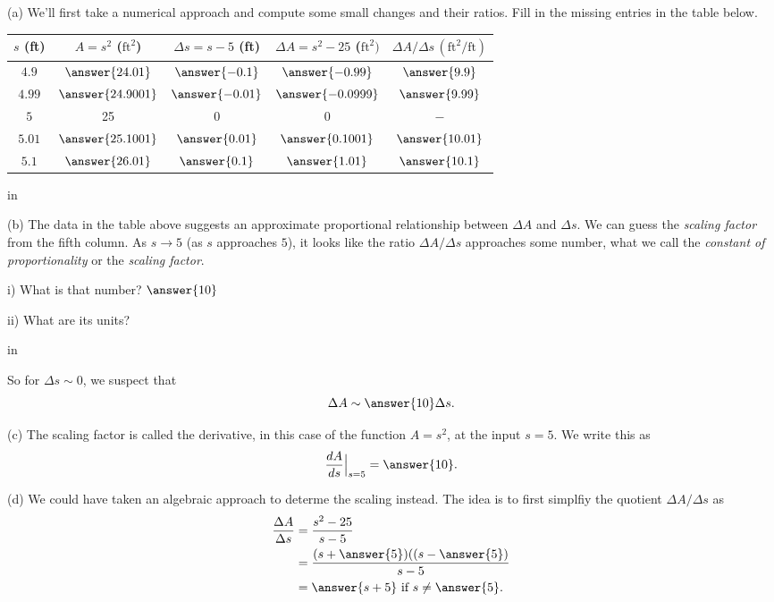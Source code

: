 \documentclass{ximera}
\newcommand{\pskip}{\vskip 0.1 in}
\begin{document}
\begin{question}  \label{Qfrdsft4t4tt}
(a) We'll first take a numerical approach and compute some small changes and their ratios. Fill in the missing entries in the table below.

\begin{center}
  \begin{tabular}{ | c| c | c | c | c |}
    \hline
    $s$ (ft) & $A = s^2$ ($\text{ft}^2$) & $\Delta s = s-5$ (ft)  & $\Delta A = s^2 - 25$ ($\text{ft}^2)$ & $\Delta A/\Delta s \, (\text{ft}^2/\text{ft})$ \\ \hline
    $4.9$ & $\answer{24.01}$ & $\answer{-0.1}$ &  $\answer{-0.99}$ & $\answer{9.9}$ \\ \hline
    $4.99$ & $\answer{24.9001}$ & $\answer{-0.01}$ &  $\answer{-0.0999}$ & $\answer{9.99}$ \\ \hline
    $5$  &  25 & $0$ & $0$ & $-$  \\ \hline
    $5.01$ & $\answer{25.1001}$ & $\answer{0.01}$ &  $\answer{0.1001}$ & $\answer{10.01}$ \\ \hline
    $5.1$ & $\answer{26.01}$ & $\answer{0.1}$ &  $\answer{1.01}$ & $\answer{10.1}$ \\ \hline
    \hline
  \end{tabular}
\end{center}

\pskip

(b) The data in the table above suggests an approximate proportional relationship between $\Delta A$ and $\Delta s$. We can guess the \emph{scaling factor} from the fifth column. As $s\to 5$ (as $s$ approaches $5$), it looks like the ratio $\Delta A/\Delta s$ approaches some number, what we call the \emph{constant of proportionality} or the \emph{scaling factor}.

i) What is that number? $\answer{10}$

ii) What are its units?
\begin{freeResponse}
\end{freeResponse}

\pskip

So for $\Delta s \sim 0$, we suspect that
\[
   \Delta A \sim \answer{10} \Delta s .
\]

(c) The scaling factor is called the derivative, in this case of the function $A=s^2$, at the input $s=5$. We write this as
\[
   \frac{dA}{ds}\Big|_{s=5} = \answer{10} .
\]

(d) We could have taken an algebraic approach to determe the scaling instead. The idea is to first simplfiy the quotient $\Delta A/\Delta s$ as
\begin{align*}
            \frac{\Delta A}{\Delta s} &= \frac{s^2-25}{s-5}  \\
                                                &= \frac{(s + \answer{5})((s - \answer{5})}{s-5} \\
                                               &= \answer{s+5} \text{ if } s\neq {\answer{5}} .
\end{align*}


\end{question}
\end{document}
